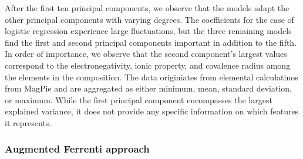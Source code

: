 \documentclass[superscriptaddress,unsortedaddress,
 amsmath,amssymb,
 aps,
]{revtex4-2}
\begin{document}
After the first ten principal components, we observe that the models adapt the other principal components with varying degrees. The coefficients for the case of logistic regression experience large fluctuations, but the three remaining models find the first and second principal components important in addition to the fifth. In order of importance, we observe that the second component's largest values correspond to the electronegativity, ionic property, and covalence radius among the elements in the composition. The data originiates from elemental calculatinos from MagPie and are aggregated as either minimum, mean, standard deviation, or maximum. While the first principal component encompasses the largest explained variance, it does not provide any specific information on which features it represents.





\subsubsection*{Augmented Ferrenti approach}
\end{document}
